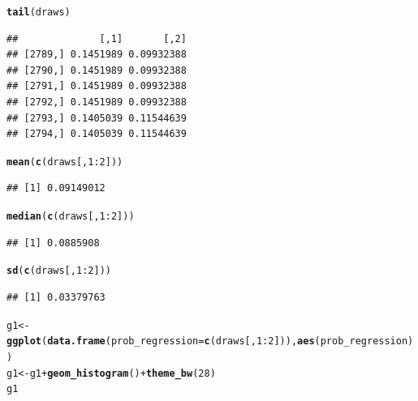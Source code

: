 \documentclass{article}\usepackage[]{graphicx}\usepackage[]{color}
\makeatletter
\newcommand{\hlnum}[1]{\textcolor[rgb]{0.686,0.059,0.569}{#1}}%
\newcommand{\hlopt}[1]{\textcolor[rgb]{0,0,0}{#1}}%
\newcommand{\hlstd}[1]{\textcolor[rgb]{0.345,0.345,0.345}{#1}}%
\newcommand{\hlkwb}[1]{\textcolor[rgb]{0.69,0.353,0.396}{#1}}%
\newcommand{\hlkwc}[1]{\textcolor[rgb]{0.333,0.667,0.333}{#1}}%
\newcommand{\hlkwd}[1]{\textcolor[rgb]{0.737,0.353,0.396}{\textbf{#1}}}%
\newenvironment{kframe}{%
 \def\at@end@of@kframe{}%
 \ifinner\ifhmode%
  \def\at@end@of@kframe{\end{minipage}}%
  \begin{minipage}{\columnwidth}%
 \fi\fi%
 \def\FrameCommand##1{\hskip\@totalleftmargin \hskip-\fboxsep
 \colorbox{shadecolor}{##1}\hskip-\fboxsep
     \hskip-\linewidth \hskip-\@totalleftmargin \hskip\columnwidth}%
 \MakeFramed {\advance\hsize-\width
   \@totalleftmargin\z@ \linewidth\hsize
   \@setminipage}}%
 {\par\unskip\endMakeFramed%
 \at@end@of@kframe}
\newenvironment{knitrout}{}{} %
\makeatother
\begin{document}
\begin{knitrout}
\color{fgcolor}\begin{kframe}
\begin{alltt}
\hlkwd{tail}\hlstd{(draws)}
\end{alltt}
\begin{verbatim}
##              [,1]       [,2]
## [2789,] 0.1451989 0.09932388
## [2790,] 0.1451989 0.09932388
## [2791,] 0.1451989 0.09932388
## [2792,] 0.1451989 0.09932388
## [2793,] 0.1405039 0.11544639
## [2794,] 0.1405039 0.11544639
\end{verbatim}
\begin{alltt}
\hlkwd{mean}\hlstd{(}\hlkwd{c}\hlstd{(draws[,} \hlnum{1}\hlopt{:}\hlnum{2}\hlstd{]))}
\end{alltt}
\begin{verbatim}
## [1] 0.09149012
\end{verbatim}
\begin{alltt}
\hlkwd{median}\hlstd{(}\hlkwd{c}\hlstd{(draws[,} \hlnum{1}\hlopt{:}\hlnum{2}\hlstd{]))}
\end{alltt}
\begin{verbatim}
## [1] 0.0885908
\end{verbatim}
\begin{alltt}
\hlkwd{sd}\hlstd{(}\hlkwd{c}\hlstd{(draws[,} \hlnum{1}\hlopt{:}\hlnum{2}\hlstd{]))}
\end{alltt}
\begin{verbatim}
## [1] 0.03379763
\end{verbatim}
\begin{alltt}
\hlstd{g1} \hlkwb{<-} \hlkwd{ggplot}\hlstd{(}\hlkwd{data.frame}\hlstd{(}\hlkwc{prob_regression} \hlstd{=} \hlkwd{c}\hlstd{(draws[,} \hlnum{1}\hlopt{:}\hlnum{2}\hlstd{])),} \hlkwd{aes}\hlstd{(prob_regression))}
\hlstd{g1} \hlkwb{<-} \hlstd{g1} \hlopt{+} \hlkwd{geom_histogram}\hlstd{()} \hlopt{+} \hlkwd{theme_bw}\hlstd{(}\hlnum{28}\hlstd{)}
\hlstd{g1}
\end{alltt}



\end{kframe}
\end{knitrout}
\end{document}
